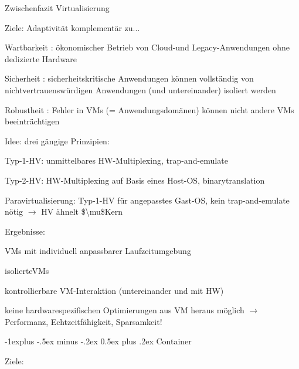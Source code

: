 \documentclass[a4paper]{article}
\makeatletter
\newcommand{\cmark}{\ding{51}}
\newcommand{\xmark}{\ding{55}}
\renewcommand{\subsection}{\@startsection{subsection}{2}{0mm}%
 {-1explus -.5ex minus -.2ex}%
 {0.5ex plus .2ex}%
 {\normalfont\normalsize\bfseries}}
\makeatother
\begin{document}
\begin{multicols}{3}
    Zwischenfazit Virtualisierung

    \begin{itemize*}
        \item
        Ziele: Adaptivität komplementär zu...
        \begin{itemize*}
            \item Wartbarkeit : ökonomischer Betrieb von Cloud-und Legacy-Anwendungen ohne dedizierte Hardware
            \item Sicherheit : sicherheitskritische Anwendungen können vollständig von nichtvertrauenswürdigen Anwendungen (und untereinander) isoliert werden
            \item Robustheit : Fehler in VMs (= Anwendungsdomänen) können nicht andere VMs beeinträchtigen
        \end{itemize*}
        \item
        Idee: drei gängige Prinzipien:
        \begin{itemize*}
            \item Typ-1-HV: unmittelbares HW-Multiplexing, trap-and-emulate
            \item Typ-2-HV: HW-Multiplexing auf Basis eines Host-OS, binarytranslation
            \item Paravirtualisierung: Typ-1-HV für angepasstes Gast-OS, kein trap-and-emulate nötig $\rightarrow$ HV ähnelt \$\textbackslash mu\$Kern
        \end{itemize*}
        \item
        Ergebnisse:
        \begin{itemize*}
            \item \cmark VMs mit individuell anpassbarer Laufzeitumgebung
            \item \cmark isolierteVMs
            \item \cmark kontrollierbare VM-Interaktion (untereinander und mit HW)
            \item \xmark keine hardwarespezifischen Optimierungen aus VM heraus möglich $\rightarrow$ Performanz, Echtzeitfähigkeit, Sparsamkeit!
        \end{itemize*}
    \end{itemize*}


    \subsection{Container}

    Ziele:


\end{multicols}
\end{document}
